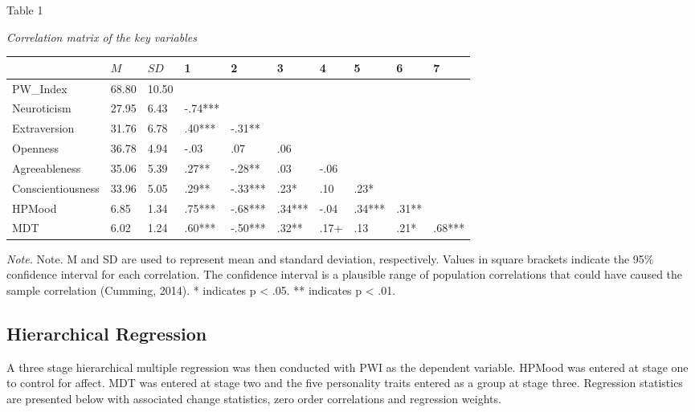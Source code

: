 \documentclass[man,floatsintext]{apa6}
\theoremstyle{definition}
\theoremstyle{definition}
\theoremstyle{definition}
\theoremstyle{remark}
\begin{document}
Table 1

\label{tab:unnamed-chunk-1}

\emph{Correlation matrix of the key variables}

\begin{longtable}[]{@{}llllllllll@{}}
\toprule
& \(M\) & \(SD\) & 1 & 2 & 3 & 4 & 5 & 6 & 7\tabularnewline
\midrule
\endhead
PW\_Index & 68.80 & 10.50 & & & & & & &\tabularnewline
Neuroticism & 27.95 & 6.43 & -.74*** & & & & & &\tabularnewline
Extraversion & 31.76 & 6.78 & .40*** & -.31** & & & & &\tabularnewline
Openness & 36.78 & 4.94 & -.03 & .07 & .06 & & & &\tabularnewline
Agreeableness & 35.06 & 5.39 & .27** & -.28** & .03 & -.06 & &
&\tabularnewline
Conscientiousness & 33.96 & 5.05 & .29** & -.33*** & .23* & .10 & .23* &
&\tabularnewline
HPMood & 6.85 & 1.34 & .75*** & -.68*** & .34*** & -.04 & .34*** & .31**
&\tabularnewline
MDT & 6.02 & 1.24 & .60*** & -.50*** & .32** & .17+ & .13 & .21* &
.68***\tabularnewline
\bottomrule
\end{longtable}

\emph{Note.} Note. M and SD are used to represent mean and standard
deviation, respectively. Values in square brackets indicate the 95\%
confidence interval for each correlation. The confidence interval is a
plausible range of population correlations that could have caused the
sample correlation (Cumming, 2014). * indicates p \textless{} .05. **
indicates p \textless{} .01.

\subsection{Hierarchical Regression}\label{hierarchical-regression}

A three stage hierarchical multiple regression was then conducted with
PWI as the dependent variable. HPMood was entered at stage one to
control for affect. MDT was entered at stage two and the five
personality traits entered as a group at stage three. Regression
statistics are presented below with associated change statistics, zero
order correlations and regression weights.
\end{document}
